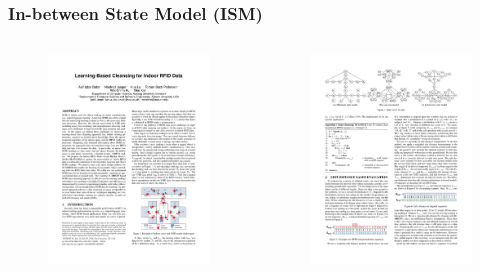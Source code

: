 \begin{frame}
\frametitle{In-between State Model (ISM)}

\begin{columns}

  \vspace{-10pt}
  \begin{figure}[tb]
    \includegraphics[width=0.75\columnwidth]{figures/3-5/3-5-1.pdf}
  \end{figure}
  \vspace{-20pt}
  \begin{figure}[tb]
    \includegraphics[width=0.75\columnwidth]{figures/3-5/3-5-8.pdf}
  \end{figure}


\end{columns}
\end{frame}
